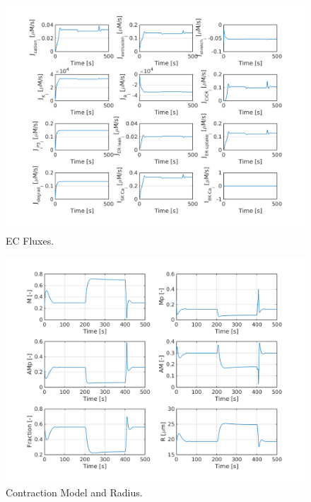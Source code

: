 \begin{landscape}
		\begin{figure}[h!]
			\centering
			\includegraphics{new_figures/6 EC Fluxes.png}
			\caption{EC Fluxes.}
			\label{fig:6}
		\end{figure}
		
		\begin{figure}[h!]
			\centering
			\includegraphics{new_figures/7 Contraction Model and Radius.png}
			\caption{Contraction Model and Radius.}
			\label{fig:7}
		\end{figure}
				
	\end{landscape}
	
